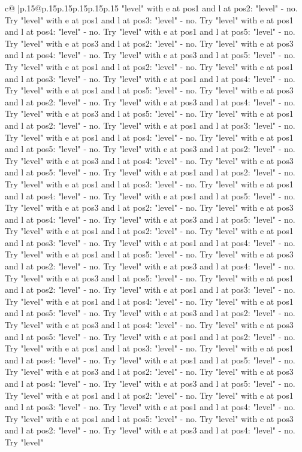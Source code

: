 \documentclass{article}
\begin{document}
{\begin{supertabular}{c@{$\;$}|p{.15\linewidth}@{}p{.15\linewidth}p{.15\linewidth}p{.15\linewidth}p{.15\linewidth}p{.15\linewidth}}
{{{"level" with e at pos1 and l at pos2: "level" {-} no. Try "level" with e at pos1 and l at pos3: "level" {-} no. Try "level" with e at pos1 and l at pos4: "level" {-} no. Try "level" with e at pos1 and l at pos5: "level" {-} no. Try "level" with e at pos3 and l at pos2: "level" {-} no. Try "level" with e at pos3 and l at pos4: "level" {-} no. Try "level" with e at pos3 and l at pos5: "level" {-} no. Try "level" with e at pos1 and l at pos2: "level" {-} no. Try "level" with e at pos1 and l at pos3: "level" {-} no. Try "level" with e at pos1 and l at pos4: "level" {-} no. Try "level" with e at pos1 and l at pos5: "level" {-} no. Try "level" with e at pos3 and l at pos2: "level" {-} no. Try "level" with e at pos3 and l at pos4: "level" {-} no. Try "level" with e at pos3 and l at pos5: "level" {-} no. Try "level" with e at pos1 and l at pos2: "level" {-} no. Try "level" with e at pos1 and l at pos3: "level" {-} no. Try "level" with e at pos1 and l at pos4: "level" {-} no. Try "level" with e at pos1 and l at pos5: "level" {-} no. Try "level" with e at pos3 and l at pos2: "level" {-} no. Try "level" with e at pos3 and l at pos4: "level" {-} no. Try "level" with e at pos3 and l at pos5: "level" {-} no. Try "level" with e at pos1 and l at pos2: "level" {-} no. Try "level" with e at pos1 and l at pos3: "level" {-} no. Try "level" with e at pos1 and l at pos4: "level" {-} no. Try "level" with e at pos1 and l at pos5: "level" {-} no. Try "level" with e at pos3 and l at pos2: "level" {-} no. Try "level" with e at pos3 and l at pos4: "level" {-} no. Try "level" with e at pos3 and l at pos5: "level" {-} no. Try "level" with e at pos1 and l at pos2: "level" {-} no. Try "level" with e at pos1 and l at pos3: "level" {-} no. Try "level" with e at pos1 and l at pos4: "level" {-} no. Try "level" with e at pos1 and l at pos5: "level" {-} no. Try "level" with e at pos3 and l at pos2: "level" {-} no. Try "level" with e at pos3 and l at pos4: "level" {-} no. Try "level" with e at pos3 and l at pos5: "level" {-} no. Try "level" with e at pos1 and l at pos2: "level" {-} no. Try "level" with e at pos1 and l at pos3: "level" {-} no. Try "level" with e at pos1 and l at pos4: "level" {-} no. Try "level" with e at pos1 and l at pos5: "level" {-} no. Try "level" with e at pos3 and l at pos2: "level" {-} no. Try "level" with e at pos3 and l at pos4: "level" {-} no. Try "level" with e at pos3 and l at pos5: "level" {-} no. Try "level" with e at pos1 and l at pos2: "level" {-} no. Try "level" with e at pos1 and l at pos3: "level" {-} no. Try "level" with e at pos1 and l at pos4: "level" {-} no. Try "level" with e at pos1 and l at pos5: "level" {-} no. Try "level" with e at pos3 and l at pos2: "level" {-} no. Try "level" with e at pos3 and l at pos4: "level" {-} no. Try "level" with e at pos3 and l at pos5: "level" {-} no. Try "level" with e at pos1 and l at pos2: "level" {-} no. Try "level" with e at pos1 and l at pos3: "level" {-} no. Try "level" with e at pos1 and l at pos4: "level" {-} no. Try "level" with e at pos1 and l at pos5: "level" {-} no. Try "level" with e at pos3 and l at pos2: "level" {-} no. Try "level" with e at pos3 and l at pos4: "level" {-} no. Try "level" }}}
\end{supertabular}}
\end{document}
